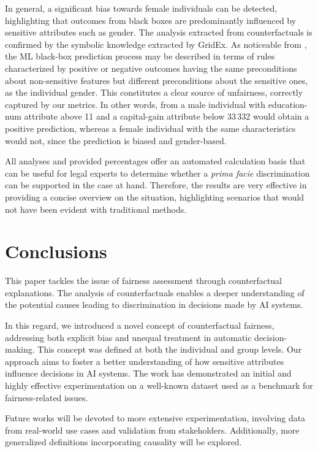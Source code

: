 \documentclass[letterpaper]{article} %
\begin{document}
In general, a significant bias towards female individuals can be detected, highlighting that outcomes from black boxes are predominantly influenced by sensitive attributes such as gender.
The analysis extracted from counterfactuals is confirmed by the symbolic knowledge extracted by GridEx. As noticeable from , the ML black-box prediction process may be described in terms of rules characterized by positive or negative outcomes having the same preconditions about non-sensitive features but different preconditions about the sensitive ones, as the individual gender. This constitutes a clear source of unfairness, correctly captured by our metrics.
%
In other words, from  a male individual with education-num attribute above 11 and a capital-gain attribute below 33\,332 would obtain a positive prediction, whereas a female individual with the same characteristics would not, since the prediction is biased and gender-based.

All analyses and provided percentages offer an automated calculation basis that can be useful for legal experts to determine whether a \emph{prima facie} discrimination can be supported in the case at hand. Therefore, the results are very effective in providing a concise overview on the situation, highlighting scenarios that would not have been evident with traditional methods.

\section{Conclusions}
This paper tackles the issue of fairness assessment through counterfactual explanations. The analysis of counterfactuals enables a deeper understanding of the potential causes leading to discrimination in decisions made by AI systems.

In this regard, we introduced a novel concept of counterfactual fairness, addressing both explicit bias and unequal treatment in automatic decision-making. This concept was defined at both the individual and group levels.
%
Our approach aims to foster a better understanding of how sensitive attributes influence decisions in AI systems.
%
The work has demonstrated an initial and highly effective experimentation on a well-known dataset used as a benchmark for fairness-related issues.

Future works will be devoted to more extensive experimentation, involving data from real-world use cases and validation from stakeholders. Additionally, more generalized definitions incorporating causality will be explored.
\end{document}
